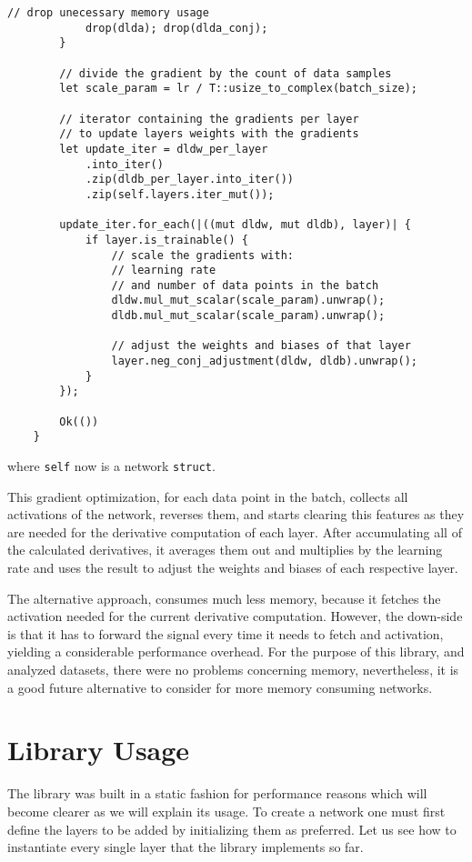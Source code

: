 \begin{lstlisting}[caption=Implementation in Rust of the complex gradient optimization.]
			// drop unecessary memory usage
			drop(dlda); drop(dlda_conj);
		}
		
		// divide the gradient by the count of data samples
		let scale_param = lr / T::usize_to_complex(batch_size);
		
		// iterator containing the gradients per layer
		// to update layers weights with the gradients
		let update_iter = dldw_per_layer
			.into_iter()
			.zip(dldb_per_layer.into_iter())
			.zip(self.layers.iter_mut());
		
		update_iter.for_each(|((mut dldw, mut dldb), layer)| {
			if layer.is_trainable() {
				// scale the gradients with:
				// learning rate 
				// and number of data points in the batch
				dldw.mul_mut_scalar(scale_param).unwrap();
				dldb.mul_mut_scalar(scale_param).unwrap();
				
				// adjust the weights and biases of that layer
				layer.neg_conj_adjustment(dldw, dldb).unwrap();
			}
		});
		
		Ok(())
	}
\end{lstlisting}
where \texttt{self} now is a network \texttt{struct}.

This gradient optimization, for each data point in the batch, collects all activations of the network, reverses them, and starts clearing this features as they are needed for the derivative computation of each layer. After accumulating all of the calculated derivatives, it averages them out and multiplies by the learning rate and uses the result to adjust the weights and biases of each respective layer.

The alternative approach, consumes much less memory, because it fetches the activation needed for the current derivative computation. However, the down-side is that it has to forward the signal every time it needs to fetch and activation, yielding a considerable performance overhead. For the purpose of this library, and analyzed datasets, there were no problems concerning memory, nevertheless, it is a good future alternative to consider for more memory consuming networks.

\section{Library Usage}

The library was built in a static fashion for performance reasons which will become clearer as we will explain its usage. To create a network one must first define the layers to be added by initializing them as preferred. Let us see how to instantiate every single layer that the library implements so far.


